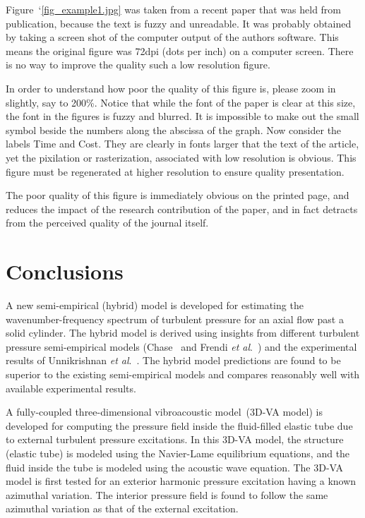 \documentclass[11pt,cleanfoot]{asme2ej}
\begin{document}
Figure~`\ref{fig_example1.jpg}
was taken from a recent paper that was held from publication, because the text is fuzzy and unreadable. It was probably obtained by taking a screen shot of the computer output of the authors software. This means the original figure was 72dpi (dots per inch) on a computer screen. There is no way to improve the quality such a low resolution figure.
 
In order to understand how poor the quality of this figure is, please zoom in slightly, say to 200\%. Notice that while the font of the paper is clear at this size, the font in the figures is fuzzy and blurred. It is impossible to make out the small symbol beside the numbers along the abscissa of the graph. Now consider the labels Time and Cost. They are clearly in fonts larger that the text of the article, yet the pixilation or rasterization, associated with low resolution is obvious. This figure must be regenerated at higher resolution to ensure quality presentation.

The poor quality of this figure is immediately obvious on the printed page, and reduces the impact of the research contribution of the paper, and in fact detracts from the perceived quality of the journal itself.



\section{Conclusions}
A new semi-empirical (hybrid) model is developed for estimating the wavenumber-frequency spectrum of turbulent pressure for an axial flow past a solid cylinder. The hybrid model is derived using insights from different turbulent pressure semi-empirical models (Chase~\cite{Chase1981} and Frendi \textit{et al}.~\cite{frendi2020}) and the experimental results of Unnikrishnan \textit{et al}.~\cite{Unni2011}. The hybrid model predictions are found to be superior to the existing semi-empirical models and compares reasonably well with available experimental results. 


A fully-coupled three-dimensional vibroacoustic model~(3D-VA model) is developed for computing the pressure field inside the fluid-filled elastic tube due to external turbulent pressure excitations. In this 3D-VA model, the structure (elastic tube) is modeled using the Navier-Lame equilibrium equations, and the fluid inside the tube is modeled using the acoustic wave equation. The 3D-VA model is first tested for an exterior harmonic pressure excitation having a known azimuthal variation. The interior pressure field is found to follow the same azimuthal variation as that of the external excitation.
\end{document}
